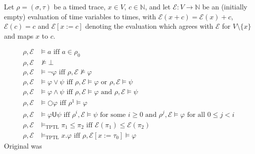 \documentclass[a4paper]{article}
\newcommand{\U}{\mathsf{U}}
\newcommand{\tand}{\text{ and }}
\newcommand{\tor}{\text{ or }}
\newcommand{\tiff}{\text{ iff }}
\newcommand{\fsome}{\text{ for some }}
\newcommand{\fall}{\text{ for all }}
\newcommand{\eval}{\mathcal{E}}
\begin{document}
\begin{defn}\label{tptlsemfull}

  Let $\rho = (\sigma,\tau)$ be a timed trace, $x\in V$, $c\in\mathbb{N}$, and let $\eval:V\to\mathbb{N}$ be an (initially empty) evaluation of time variables to times, with $\eval(x + c) = \eval(x) + c$, $\eval(c) = c$ and $\eval[x:=c]$ denoting the evaluation which agrees with $\eval$ for $V\setminus\{x\}$ and maps $x$ to $c$.

  \begin{align*}
    \rho,\eval&\vDash a \tiff a \in \rho_0\\
    \rho,\eval&\nvDash \bot\\
    \rho,\eval&\vDash \neg \varphi \tiff \rho,\eval \nvDash \varphi\\
    \rho,\eval&\vDash \varphi \lor \psi \tiff \rho,\eval \vDash \varphi \tor \rho,\eval \vDash \psi\\
    \rho,\eval&\vDash \varphi \land \psi \tiff \rho,\eval \vDash \varphi \tand \rho,\eval \vDash \psi\\
    \rho,\eval&\vDash \bigcirc \varphi \tiff \rho^1 \vDash \varphi\\
    \rho,\eval&\vDash \varphi \U \psi \tiff \rho^i,\eval \vDash \psi \fsome i \geq 0 \tand \rho^j,\eval \vDash \varphi \fall 0 \leq j < i\\
    \rho,\eval &\vDash_{\text{TPTL}}\pi_1\leq\pi_2 \tiff \eval(\pi_1)\leq\eval(\pi_2)\\
    \rho,\eval &\vDash_{\text{TPTL}} x.\varphi \tiff \rho,\eval[x:=\tau_0]\vDash\varphi
  \end{align*}
  Original was 
\end{defn}
\end{document}
